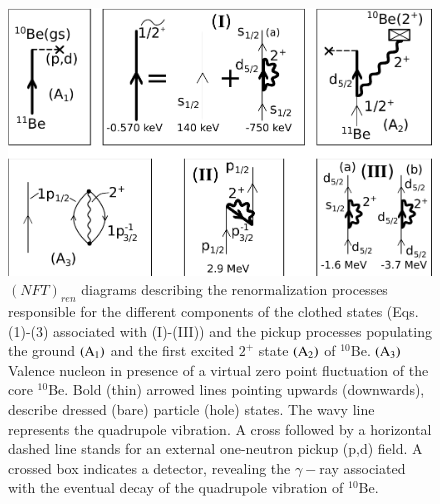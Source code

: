    \begin{figure}
   \centerline{\includegraphics*[width=12cm,angle=0]{C8/figsC8/Fig6_2_3}}
   	\caption{$(NFT)_{ren}$ diagrams describing the renormalization  processes
   	responsible for the different components of the clothed states (Eqs. (1)-(3) associated with 
   	(I)-(III)) and the pickup processes populating the ground ${\rm  (A_1)} $ and the first excited $2^+$
   	state ${\rm (A_2)} $ of $^{10}$Be. ${\rm (A_3)} $ Valence nucleon in presence 
   	of a virtual zero point fluctuation of the core $^{10}$Be. Bold (thin) arrowed lines pointing upwards
   	(downwards), describe dressed (bare) particle (hole) states. The wavy line represents the 
   	quadrupole vibration. A cross followed by  a horizontal dashed line stands for an external one-neutron 
   	pickup (p,d) field. A crossed box indicates a detector, revealing the $\gamma-$ray
   	associated with the eventual decay of the quadrupole vibration of $^{10}$Be.}\label{fig6.2.3x}
   \end{figure} 
